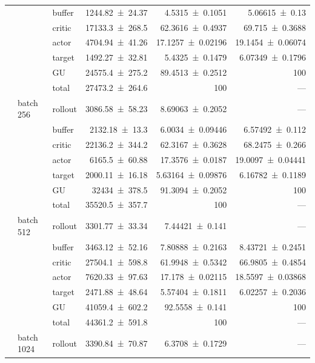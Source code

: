 {\begin{longtable}{@{}lllrrr@{}}
     &  & buffer & \num{1244.82+-24.37} & \num{4.5315+-0.1051} & \num{5.06615+-0.13} \\
     &  & critic & \num{17133.3+-268.5} & \num{62.3616+-0.4937} & \num{69.715+-0.3688} \\
     &  & actor & \num{4704.94+-41.26} & \num{17.1257+-0.02196} & \num{19.1454+-0.06074} \\
     &  & target & \num{1492.27+-32.81} & \num{5.4325+-0.1479} & \num{6.07349+-0.1796} \\
     &  & GU & \num{24575.4+-275.2} & \num{89.4513+-0.2512} & 100 \\
     &  & total & \num{27473.2+-264.6} & \num{100} & --- \\
    \addlinespace[2pt]
     & batch 256 & rollout & \num{3086.58+-58.23} & \num{8.69063+-0.2052} & --- \\
     &  & buffer & \num{2132.18+-13.3} & \num{6.0034+-0.09446} & \num{6.57492+-0.112} \\
     &  & critic & \num{22136.2+-344.2} & \num{62.3167+-0.3628} & \num{68.2475+-0.266} \\
     &  & actor & \num{6165.5+-60.88} & \num{17.3576+-0.0187} & \num{19.0097+-0.04441} \\
     &  & target & \num{2000.11+-16.18} & \num{5.63164+-0.09876} & \num{6.16782+-0.1189} \\
     &  & GU & \num{32434+-378.5} & \num{91.3094+-0.2052} & 100 \\
     &  & total & \num{35520.5+-357.7} & \num{100} & --- \\
    \addlinespace[2pt]
     & batch 512 & rollout & \num{3301.77+-33.34} & \num{7.44421+-0.141} & --- \\
     &  & buffer & \num{3463.12+-52.16} & \num{7.80888+-0.2163} & \num{8.43721+-0.2451} \\
     &  & critic & \num{27504.1+-598.8} & \num{61.9948+-0.5342} & \num{66.9805+-0.4854} \\
     &  & actor & \num{7620.33+-97.63} & \num{17.178+-0.02115} & \num{18.5597+-0.03868} \\
     &  & target & \num{2471.88+-48.64} & \num{5.57404+-0.1811} & \num{6.02257+-0.2036} \\
     &  & GU & \num{41059.4+-602.2} & \num{92.5558+-0.141} & 100 \\
     &  & total & \num{44361.2+-591.8} & \num{100} & --- \\
    \addlinespace[2pt]
     & batch 1024 & rollout & \num{3390.84+-70.87} & \num{6.3708+-0.1729} & --- \\

\end{longtable}}
